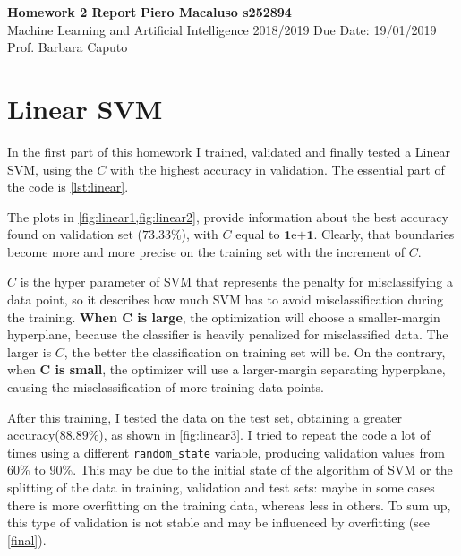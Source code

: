 \documentclass[a4paper, 11pt]{article}
\begin{document}
	\noindent
	\large\textbf{Homework 2 Report} \hfill \textbf{Piero Macaluso s252894} \\
	\normalsize Machine Learning and Artificial Intelligence 2018/2019 \hfill Due Date: 19/01/2019 \\
	Prof. Barbara Caputo  
	
	\section{Linear SVM} \label{linearsvm}
	
	In the first part of this homework I trained, validated and finally tested a Linear SVM, using the $C$ with the highest accuracy in validation. The essential part of the code is \vref{lst:linear}.
	
	
%	
%	
	
	The plots in \vref{fig:linear1,fig:linear2}, provide information about the best accuracy found on validation set ($\boldsymbol{73.33\%}$), with $C$ equal to  $\boldsymbol{1\mathrm{e}{+1}}$. Clearly, that boundaries become more and more precise on the training set with the increment of $C$. 
	
	$C$ is the hyper parameter of SVM that represents the penalty for misclassifying a data point, so it describes how much SVM has to avoid misclassification during the training.
	\textbf{When $\boldsymbol{C}$ is large}, the optimization will choose a smaller-margin hyperplane, because the classifier is heavily penalized for misclassified data.
	The larger is $C$, the better the classification on training set will be. On the contrary, when \textbf{$\boldsymbol{C}$ is small}, the optimizer will use a larger-margin separating hyperplane, causing the misclassification of more training data points.
	
	After this training, I tested the data on the test set, obtaining a greater accuracy($\boldsymbol{88.89\%}$), as shown in \vref{fig:linear3}.  I tried to repeat the code a lot of times using a different \texttt{random\_state} variable, producing validation values from $60\%$ to $90\%$. This may be due to the initial state of the algorithm of SVM or the splitting of the data in training, validation and test sets: maybe in some cases there is more overfitting on the training data, whereas less in others. To sum up, this type of validation is not stable and may be influenced by overfitting (see \vref{final}).
\end{document}
